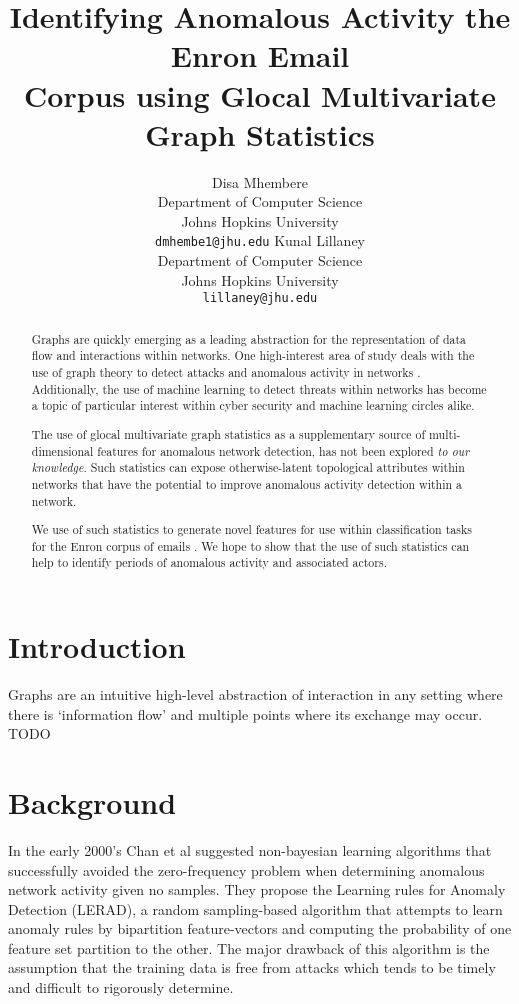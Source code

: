 \documentclass[11pt,letterpaper]{article}
\title{Identifying Anomalous Activity the Enron Email \\
				Corpus using Glocal Multivariate Graph Statistics}
\author{Disa Mhembere\\
  Department of Computer Science\\
  Johns Hopkins University\\
  {\tt dmhembe1@jhu.edu}
  \And
  Kunal Lillaney \\
  Department of Computer Science\\
  Johns Hopkins University\\
  {\tt lillaney@jhu.edu}}
\date{}
\begin{document}
\maketitle
\begin{abstract}
Graphs are quickly emerging as a leading abstraction for the representation of data
flow and interactions within networks. One high-interest area of study deals with 
the use of graph theory to detect attacks and anomalous activity in networks 
\cite{priebe2005scan,park2009anomaly,park2013anomaly}.
Additionally, the use of machine learning to detect threats within networks 
has become a topic of particular interest 
\cite{mahoney2003machine,shon2005machine,sommer2010outside,shon2007hybrid} within
cyber security and machine learning circles alike.

The use of glocal multivariate graph statistics \cite{mhembere2013computing} as 
a supplementary source of multi-dimensional features for anomalous network detection,
has not been explored \textit{to our knowledge}. Such statistics can expose 
otherwise-latent topological attributes within networks that have the potential 
to improve anomalous activity detection within a network.

We use of such statistics to generate novel features for use within
classification tasks for the Enron corpus of emails \cite{enronrepo2009}.
We hope to show that the use of such statistics can help to identify periods of
anomalous activity and associated actors.
\end{abstract}


\section{Introduction}
Graphs are an intuitive high-level abstraction of interaction in any setting where
there is `information flow' and multiple points where its exchange may occur. TODO

\section{Background}
In the early 2000's Chan et al \cite{chan2003machine} suggested non-bayesian 
learning algorithms that successfully avoided the zero-frequency problem when determining
anomalous network activity given no samples. They propose the Learning rules for Anomaly
Detection (LERAD), a random sampling-based algorithm that attempts to learn anomaly
rules by bipartition feature-vectors and computing the probability of one feature set
partition to the other. The major drawback of this algorithm is the assumption that the 
training data is free from attacks which tends to be timely and difficult to rigorously
determine.
\end{document}
